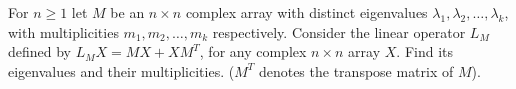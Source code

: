For \(n\geq 1\) let \(M\) be an \(n\times n\) complex array with distinct eigenvalues \(\lambda_1,\lambda_2,\ldots,\lambda_k\), with multiplicities \(m_1,m_2,\ldots,m_k\) respectively. Consider the linear operator \(L_M\) defined by \(L_MX=MX+XM^T\), for any complex \(n\times n\) array \(X\). Find its eigenvalues and their multiplicities. (\(M^T\) denotes the transpose matrix of \(M\)).